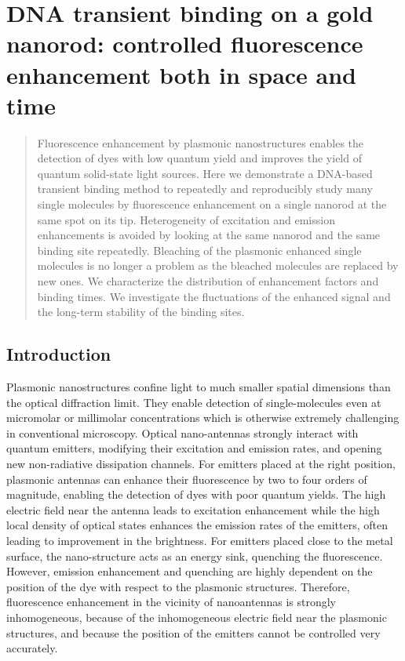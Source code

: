 \chapter{DNA transient binding on a gold nanorod: controlled fluorescence enhancement both in space and time}
\label{chapter:transient}
\graphicspath{{./chapters/c5_transient_binding/figures/}}

\begin{abstract}
  Fluorescence enhancement by plasmonic nanostructures enables the detection of dyes with low quantum yield and improves the yield of quantum solid-state light sources.
  Here we demonstrate a DNA-based transient binding method to repeatedly and reproducibly study many single molecules by fluorescence enhancement on a single nanorod at the same spot on its tip.
  Heterogeneity of excitation and emission enhancements is avoided by looking at the same nanorod and the same binding site repeatedly.
  Bleaching of the plasmonic enhanced single molecules is no longer a problem as the bleached molecules are replaced by new ones.
  We characterize the distribution of enhancement factors and binding times. We investigate the fluctuations of the enhanced signal and the long-term stability of the binding sites.
\end{abstract}
\section{Introduction}
Plasmonic nanostructures confine light to much smaller spatial dimensions than the optical diffraction limit. They enable detection of single-molecules even at micromolar or millimolar concentrations which is otherwise extremely challenging in conventional microscopy.\cite{levene2003zeromode,punj2013a,schuller2010plasmonics}
Optical nano-antennas strongly interact with quantum emitters, modifying their excitation and emission rates, and opening new non-radiative dissipation channels.
For emitters placed at the right position, plasmonic antennas can enhance their fluorescence by two to four orders of magnitude, enabling the detection of dyes with poor quantum yields.\cite{lakowicz2005radiative,anger2006enhancement,kinkhabwala2009large,acuna2012fluorescence,yuan2013thousandfold,khatua2014resonant}
The high electric field near the antenna leads to excitation enhancement while the high local density of optical states enhances the emission rates of the emitters, often leading to improvement in the brightness.
For emitters placed close to the metal surface, the nano-structure acts as an energy sink, quenching the fluorescence.\cite{seelig2007nanoparticleinduced,muskens2007strong,acuna2012distance,matsuzaki2017strong}
However, emission enhancement and quenching are highly dependent on the position of the dye with respect to the plasmonic structures. Therefore, fluorescence enhancement in the vicinity of nanoantennas is strongly inhomogeneous, because of the inhomogeneous electric field near the plasmonic structures, and because the position of the emitters cannot be controlled very accurately. 

